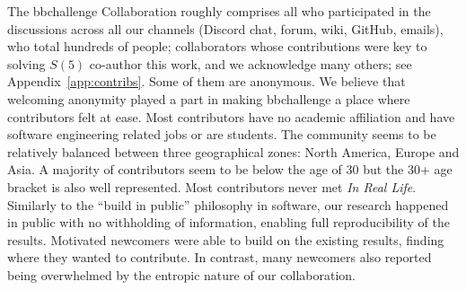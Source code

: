 \documentclass[a4paper,british]{article}
\theoremstyle{definition} %
\numberwithin{equation}{section}
\theoremstyle{definition} %
\newcommand{\CoqBB}{Coq-BB5\xspace}
\begin{document}
The bbchallenge Collaboration roughly comprises all who participated in the discussions across all our channels (Discord chat, forum, wiki, GitHub, emails), who total hundreds of people; collaborators whose contributions were key to solving $S(5)$ co-author this work, and we acknowledge many others; see Appendix~\ref{app:contribs}.  Some of them are anonymous. We believe that welcoming anonymity played a part in making bbchallenge a place where contributors felt at ease. Most contributors have no academic affiliation and have software engineering related jobs or are students. The community seems to be relatively balanced between three geographical zones: North America, Europe and Asia. A majority of contributors seem to be below the age of 30 but the 30+ age bracket is also well represented. Most contributors never met \textit{In Real Life}. Similarly to the ``build in public'' philosophy in software, our research happened in public with no withholding of information, enabling full reproducibility of the results. Motivated newcomers were able to build on the existing results, finding where they wanted to contribute. In contrast, many newcomers also reported being overwhelmed by the entropic nature of our collaboration.



\end{document}
